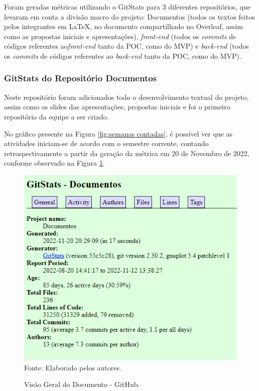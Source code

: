 \documentclass[
    12pt,               %
    openright,          %
    oneside,
    a4paper,            %
    BIBLATEX,           %
    TODO,               %
    english,            %
    brazil              %
    ]{ifsp-spo-inf-ctds}
\begin{document}
    Foram geradas métricas utilizando o GitStats para 3 diferentes repositórios, que levaram em conta a divisão macro do projeto: Documentos (todos os textos feitos pelos integrantes em LaTeX, no documento compartilhado no Overleaf, assim como as propostas iniciais e apresentações), \emph{front-end} (todos os \emph{commits} de códigos referentes ao\emph{front-end} tanto da POC, como do MVP) e \emph{back-end} (todos os \emph{commits} de códigos referentes ao \emph{back-end} tanto da POC, como do MVP).


    \subsubsection{GitStats do Repositório Documentos}
    
    Neste repositório foram adicionados todo o desenvolvimento textual do projeto, assim como os slides das apresentações, propostas iniciais e foi o primeiro repositório da equipe a ser criado. 
    
    No gráfico presente na Figura \ref{fig:semanas contadas}, é possível ver que as atividades iniciam-se de acordo com o semestre corrente, contando retrospectivamente a partir da geração da métrica em 20 de Novembro de 2022, conforme observado na Figura \ref{fig:geralDoc}.

    \begin{figure}[H]
            \centering
            \caption{Visão Geral do Documento - GitHub.}
            \includegraphics[width=1 \textwidth]{Gitstats/documento/geralDoc.png}
            {\footnotesize Fonte: Elaborado pelos autores.}
            \label{fig:geralDoc}
    \end{figure}
\end{document}
